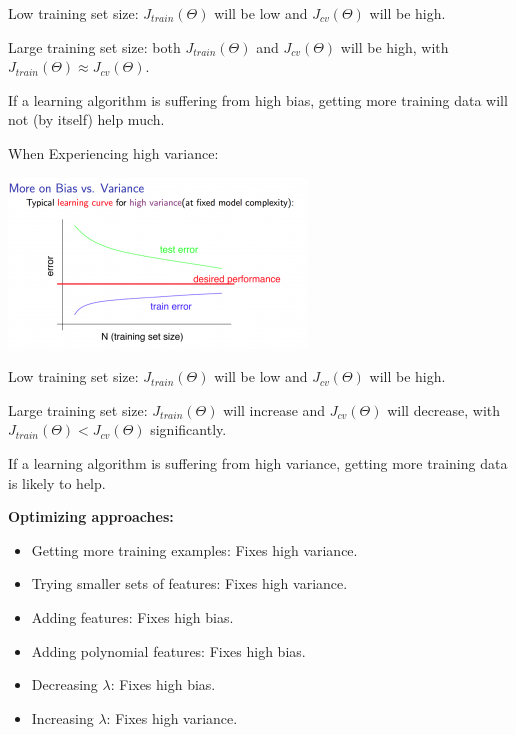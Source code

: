 \documentclass{article}
\begin{document}
\noindent Low training set size: \(J_{train}(\Theta)\) will be low and \(J_{cv}(\Theta)\) will be high.

\noindent Large training set size: both \(J_{train}(\Theta)\) and \(J_{cv}(\Theta)\) will be high, with \(J_{train}(\Theta) \approx J_{cv}(\Theta)\).

\noindent If a learning algorithm is suffering from high bias, getting more training data will not (by itself) help much.

\bigskip

\noindent When Experiencing high variance:

\begin{center}
\includegraphics[scale=0.6]{./images/experiencing_high_variance.png}
\end{center}

\noindent Low training set size: \(J_{train}(\Theta)\) will be low and \(J_{cv}(\Theta)\) will be high.

\noindent Large training set size: \(J_{train}(\Theta)\) will increase and \(J_{cv}(\Theta)\) will decrease, with \(J_{train}(\Theta) < J_{cv}(\Theta)\) significantly.

\noindent If a learning algorithm is suffering from high variance, getting more training data is likely to help.

\bigskip

\noindent \textbf{Optimizing approaches:}

\begin{itemize}
\item Getting more training examples: Fixes high variance.
\item Trying smaller sets of features: Fixes high variance.
\item Adding features: Fixes high bias.
\item Adding polynomial features: Fixes high bias.
\item Decreasing \(\lambda\): Fixes high bias.
\item Increasing \(\lambda\): Fixes high variance.
\end{itemize}
\end{document}
